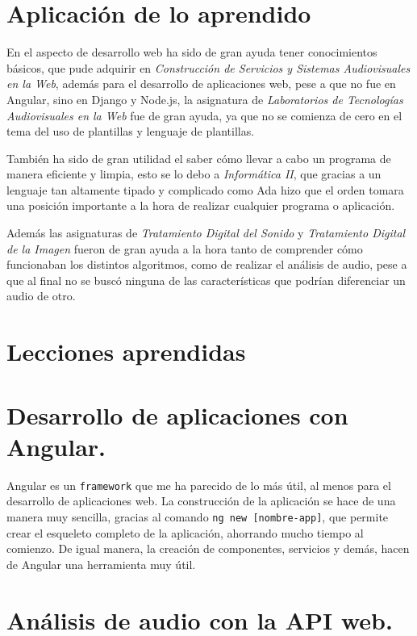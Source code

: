 \documentclass[a4paper, 12pt]{book}
\begin{document}
\section{Aplicación de lo aprendido}
\label{sec:aplicacion}

En el aspecto de desarrollo web ha sido de gran ayuda tener conocimientos básicos, que pude adquirir en \textit{Construcción de Servicios y Sistemas Audiovisuales en la Web}, además para el desarrollo de aplicaciones web, pese a que no fue en Angular, sino en Django y Node.js, la asignatura de \textit{Laboratorios de Tecnologías Audiovisuales en la Web} fue de gran ayuda, ya que no se comienza de cero en el tema del uso de plantillas y lenguaje de plantillas.

También ha sido de gran utilidad el saber cómo llevar a cabo un programa de manera eficiente y limpia, esto se lo debo a \textit{Informática II}, que gracias a un lenguaje tan altamente tipado y complicado como Ada hizo que el orden tomara una posición importante a la hora de realizar cualquier programa o aplicación.

Además las asignaturas de \textit{Tratamiento Digital del Sonido} y \textit{Tratamiento Digital de la Imagen} fueron de gran ayuda a la hora tanto de comprender cómo funcionaban los distintos algoritmos, como de realizar el análisis de audio, pese a que al final no se buscó ninguna de las características que podrían diferenciar un audio de otro.


\section{Lecciones aprendidas}
\label{sec:lecciones_aprendidas}

\section*{Desarrollo de aplicaciones con Angular.}

Angular es un \texttt{framework} que me ha parecido de lo más útil, al menos para el desarrollo de aplicaciones web. La construcción de la aplicación se hace de una manera muy sencilla, gracias al comando \texttt{ng new [nombre-app]}, que permite crear el esqueleto completo de la aplicación, ahorrando mucho tiempo al comienzo. De igual manera, la creación de componentes, servicios y demás, hacen de Angular una herramienta muy útil.

\section*{Análisis de audio con la API web.}
\end{document}
